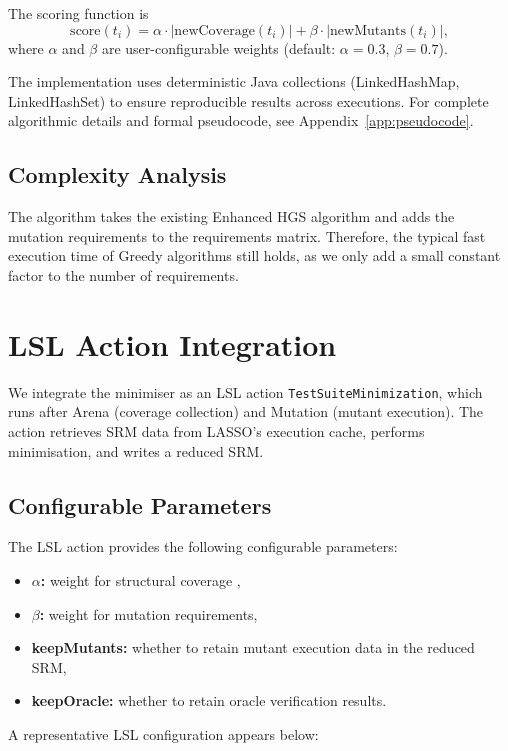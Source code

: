 The scoring function is
\[
\mathrm{score}(t_i) = \alpha \cdot |\mathrm{newCoverage}(t_i)| + \beta \cdot |\mathrm{newMutants}(t_i)|,
\]
where $\alpha$ and $\beta$ are user-configurable weights (default: $\alpha = 0.3$, $\beta = 0.7$).

The implementation uses deterministic Java collections (LinkedHashMap, LinkedHashSet) to ensure reproducible results across executions. For complete algorithmic details and formal pseudocode, see Appendix~\ref{app:pseudocode}.

\subsection{Complexity Analysis}

The algorithm takes the existing Enhanced HGS algorithm and adds the mutation requirements to the requirements matrix. Therefore, the typical fast execution time of Greedy algorithms still holds, as we only add a small constant factor to the number of requirements.

\section{LSL Action Integration}

We integrate the minimiser as an LSL action \texttt{TestSuiteMinimization}, which runs after Arena (coverage collection) and Mutation (mutant execution). The action retrieves SRM data from LASSO's execution cache, performs minimisation, and writes a reduced SRM.

\subsection{Configurable Parameters}

The LSL action provides the following configurable parameters:

\begin{itemize}
  \item \textbf{$\alpha$:} weight for structural coverage ,
  \item \textbf{$\beta$:} weight for mutation requirements,
  \item \textbf{keepMutants:} whether to retain mutant execution data in the reduced SRM,
  \item \textbf{keepOracle:} whether to retain oracle verification results.
\end{itemize}

A representative LSL configuration appears below:

